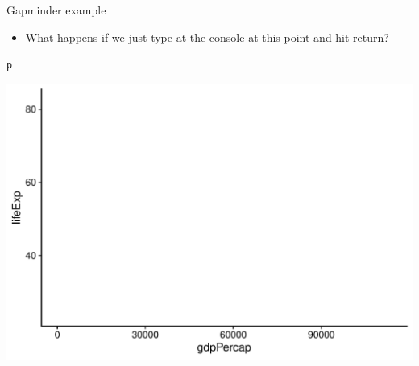 \documentclass[10pt]{beamer}\usepackage[]{graphicx}\usepackage[]{color}
\makeatletter
\def\maxwidth{ %
  \ifdim\Gin@nat@width>\linewidth
    \linewidth
  \else
    \Gin@nat@width
  \fi
}
\newcommand{\hlstd}[1]{\textcolor[rgb]{0.345,0.345,0.345}{#1}}%
\newenvironment{kframe}{%
 \def\at@end@of@kframe{}%
 \ifinner\ifhmode%
  \def\at@end@of@kframe{\end{minipage}}%
  \begin{minipage}{\columnwidth}%
 \fi\fi%
 \def\FrameCommand##1{\hskip\@totalleftmargin \hskip-\fboxsep
 \colorbox{shadecolor}{##1}\hskip-\fboxsep
     \hskip-\linewidth \hskip-\@totalleftmargin \hskip\columnwidth}%
 \MakeFramed {\advance\hsize-\width
   \@totalleftmargin\z@ \linewidth\hsize
   \@setminipage}}%
 {\par\unskip\endMakeFramed%
 \at@end@of@kframe}
\newenvironment{knitrout}{}{} %
\makeatother
\begin{document}
\begin{frame}[fragile]{Gapminder example}
	
	\begin{itemize}
		\item What happens if we just type  at the console at this point and hit return?
	\end{itemize}

\pause 
	
\begin{knitrout}\tiny
{}\color{fgcolor}\begin{kframe}
\begin{alltt}
\hlstd{p}
\end{alltt}
\end{kframe}

{\centering \includegraphics[width=\maxwidth]{figure/unnamed-chunk-5-1} 

}


\end{knitrout}
	
\end{frame}
\end{document}
